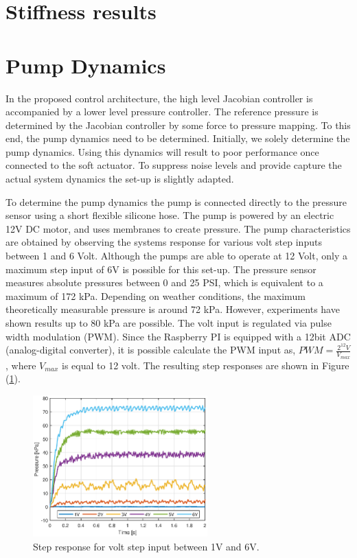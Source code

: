 \section{Stiffness results}

\section{Pump Dynamics}


In the proposed control architecture, the high level Jacobian controller is accompanied by a lower level pressure controller. The reference pressure is determined by the Jacobian controller by some force to pressure mapping. To this end, the pump dynamics need to be determined. Initially, we solely determine the pump dynamics. Using this dynamics will result to poor performance once connected to the soft actuator. To suppress noise levels and provide capture the actual system dynamics the set-up is slightly adapted.

To determine the pump dynamics the pump is connected directly to the pressure sensor using a short flexible silicone hose. The pump is powered by an electric 12V DC motor, and uses membranes to create pressure. The pump characteristics are obtained by observing the systems response for various volt step inputs between 1 and 6 Volt. Although the pumps are able to operate at 12 Volt, only a maximum step input of 6V is possible for this set-up. The pressure sensor measures absolute pressures between 0 and 25 PSI, which is equivalent to a maximum of 172 kPa. Depending on weather conditions, the maximum theoretically measurable pressure is around 72 kPa. However, experiments have shown results up to 80 kPa are possible. The volt input is regulated via pulse width modulation (PWM). Since the Raspberry PI is equipped with a 12bit ADC (analog-digital converter), it is possible calculate the PWM input as, $\textit{PWM} = \frac{2^{12} V}{V_{max}} $, where $V_{max}$ is equal to 12 volt.  The resulting step responses are shown in Figure (\ref{fig1:pump_dynamcis}).

\begin{figure}[H]
    \centering
    \includegraphics[width = 0.6\textwidth]{Figures/Chapter3/stepresponsdirect16V.eps}
    \caption{Step response for volt step input between 1V and 6V.}
    \label{fig1:pump_dynamcis}
\end{figure}

